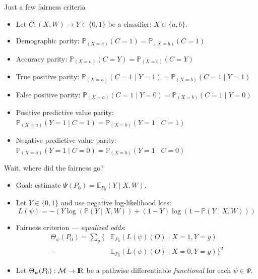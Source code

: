 \documentclass[12pt,t,handout]{beamer}
\newcommand{\E}{\mathbb{E}}
\newcommand{\pr}{\mathbb{P}}
\newcommand{\openr}{\hbox{${\rm I\kern-.2em R}$}}
\begin{document}

\begin{frame}[c]{Just a few fairness criteria}

\begin{center}
\begin{itemize}
  \itemsep8pt
  \item Let $C: (X, W) \to Y \in \{0, 1\}$ be a classifier; $X \in \{a, b\}$.
  \item Demographic parity: $\pr_{(X = a)}(C = 1) = \pr_{(X = b)}(C = 1)$
  \item Accuracy parity: $\pr_{(X = a)}(C = Y) = \pr_{(X = b)}(C = Y)$
  \item True positive parity: $\pr_{(X = a)}(C = 1 \mid Y = 1) =
    \pr_{(X = b)}(C = 1 \mid Y = 1)$
  \item False positive parity: $\pr_{(X = a)}(C = 1 \mid Y = 0) =
    \pr_{(X = b)}(C = 1 \mid Y = 0)$
  \item Positive predictive value parity: $\pr_{(X = a)}(Y = 1 \mid C = 1) =
    \pr_{(X = b)}(Y = 1 \mid C = 1)$
  \item Negative predictive value parity: $\pr_{(X = a)}(Y = 1 \mid C = 0) =
    \pr_{(X = b)}(Y = 1 \mid C = 0)$
\end{itemize}
\end{center}


\end{frame}


\begin{frame}[c]{Wait, where did the fairness go?}

\begin{center}
\begin{itemize}
  \itemsep12pt
  \item Goal: estimate $\Psi(P_0) = \E_{P_0}(Y \mid X, W)$.
  \item Let $Y \in \{0, 1\}$ and use negative log-likelihood loss:
    $$L(\psi) = -(Y \log(\pr(Y \mid X, W)) + (1 - Y) \log(1 -
    \pr(Y \mid X, W)))$$
  \item Fairness criterion --- \textit{equalized odds}:
    $$\begin{aligned}
      \Theta_{\psi}(P_0) = \sum_y \{&\E_{P_0}(L(\psi)(O) \mid X = 1, Y = y) \\ -
      &\E_{P_0}(L(\psi)(O) \mid X = 0, Y = y)\}^2
    \end{aligned}$$
  \item Let $\Theta_{\psi}(P_0): \mathcal{M} \rightarrow \openr$ be a pathwise
    differentiable \textit{functional} for each $\psi \in \Psi$.
\end{itemize}
\end{center}


\end{frame}
\end{document}
